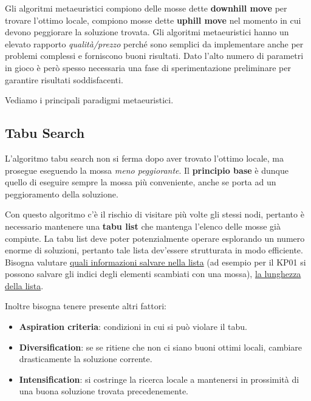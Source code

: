 \documentclass[11pt, oneside]{book}
\begin{document}
\par\bigskip

Gli algoritmi metaeuristici compiono delle mosse dette {\bf downhill
  move} per trovare l'ottimo locale, compiono mosse dette {\bf uphill
  move} nel momento in cui devono peggiorare la soluzione trovata. Gli
algoritmi metaeuristici hanno un elevato rapporto {\em
  qualit\`a/prezzo} perch\'e sono semplici da implementare anche per
problemi complessi e forniscono buoni risultati. Dato l'alto numero di
parametri in gioco \`e per\`o spesso necessaria una fase di
sperimentazione preliminare per garantire risultati soddisfacenti.

\par\bigskip

Vediamo i principali paradigmi metaeuristici.

\subsection{Tabu Search}

L'algoritmo tabu search non si ferma dopo aver trovato l'ottimo
locale, ma prosegue eseguendo la mossa {\em meno peggiorante}. Il {\bf
  principio base} \`e dunque quello di eseguire sempre la mossa pi\`u
conveniente, anche se porta ad un peggioramento della soluzione.

\par\bigskip

Con questo algoritmo c'\`e il rischio di visitare pi\`u volte gli
stessi nodi, pertanto \`e necessario mantenere una {\bf tabu list} che
mantenga l'elenco delle mosse gi\`a compiute. La tabu list deve poter
potenzialmente operare esplorando un numero enorme di soluzioni,
pertanto tale lista dev'essere strutturata in modo efficiente. Bisogna
valutare \underline{quali informazioni salvare nella lista} (ad
esempio per il KP01 si possono salvare gli indici degli elementi
scambiati con una mossa), \underline{la lunghezza della lista}.

\par\bigskip

Inoltre bisogna tenere presente altri fattori:

\begin{itemize}
\item {\bf Aspiration criteria}: condizioni in cui si pu\`o violare il tabu.

\item {\bf Diversification}: se se ritiene che non ci siano buoni
  ottimi locali, cambiare drasticamente la soluzione corrente.

\item {\bf Intensification}: si costringe la ricerca locale a
  mantenersi in prossimit\`a di una buona soluzione trovata
  precedenemente.
\end{itemize}
\end{document}
